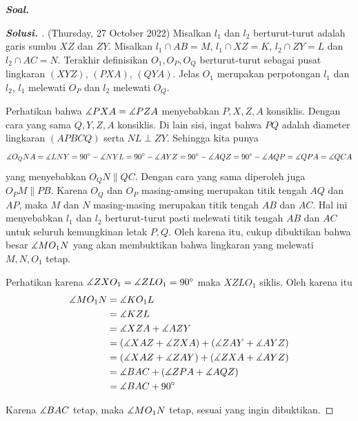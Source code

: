 \textbf{\textit{Soal. }}

\begin{proof}[\textbf{Solusi. }] (Thursday, 27 October 2022) Misalkan $l_1$ dan $l_2$ berturut-turut adalah garis sumbu $XZ$ dan $ZY$. Misalkan $l_1 \cap AB = M$, $l_1 \cap XZ = K$, $l_2 \cap ZY = L$ dan $l_2 \cap AC = N$.  Terakhir definisikan $O_1, O_P, O_Q$ berturut-turut sebagai pusat lingkaran $(XYZ)$, $(PXA)$, $(QYA)$. Jelas $O_1$ merupakan perpotongan $l_1$ dan $l_2$, $l_1$ melewati $O_P$ dan $l_2$ melewati $O_Q$.

% 


Perhatikan bahwa $\measuredangle PXA = \measuredangle PZA$ menyebabkan $P,X,Z,A$ konsiklis. Dengan cara yang sama $Q,Y,Z,A$ konsiklis. Di lain sisi, ingat bahwa $PQ$ adalah diameter lingkaran $(APBCQ)$ serta $NL \perp ZY$. Sehingga kita punya $$\measuredangle O_QNA = \measuredangle LNY = 90^\circ-\measuredangle NYL = 90^\circ-\measuredangle AYZ = 90^\circ-\measuredangle AQZ = 90^\circ-\measuredangle AQP=\measuredangle QPA = \measuredangle QCA$$ yang menyebabkan $O_QN \parallel QC$. Dengan cara yang sama diperoleh juga $O_PM \parallel PB$. Karena $O_Q$ dan $O_P$ masing-amsing merupakan titik tengah $AQ$ dan $AP$, maka $M$ dan $N$ masing-masing merupakan titik tengah $AB$ dan $AC$. Hal ini menyebabkan $l_1$ dan $l_2$ berturut-turut pasti melewati titik tengah $AB$ dan $AC$ untuk seluruh kemungkinan letak $P,Q$. Oleh karena itu, cukup dibuktikan bahwa besar $\measuredangle MO_1N$ yang akan membuktikan bahwa lingkaran yang melewati $M,N,O_1$ tetap.

Perhatikan karena $\measuredangle ZXO_1 = \measuredangle ZLO_1 = 90^\circ$ maka $XZLO_1$ siklis. Oleh karena itu 
\begin{align*}
    \measuredangle MO_1N 
    &= \measuredangle KO_1L\\ 
    &= \measuredangle KZL\\
    &= \measuredangle XZA + \measuredangle AZY\\ 
    &= (\measuredangle XAZ + \measuredangle ZXA) + (\measuredangle ZAY + \measuredangle AYZ)\\
    &= (\measuredangle XAZ + \measuredangle ZAY)+ (\measuredangle ZXA + \measuredangle AYZ)\\
    &= \measuredangle BAC + (\measuredangle ZPA + \measuredangle AQZ)\\
    &= \measuredangle BAC + 90^\circ
\end{align*}

Karena $\measuredangle BAC$ tetap, maka $\measuredangle MO_1N$ tetap, sesuai yang ingin dibuktikan.
    
\end{proof}